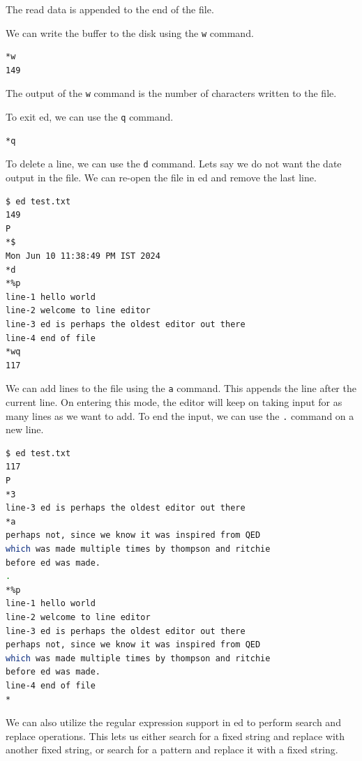 The read data is appended to the end of the file.

We can write the buffer
to the disk using the \lstinline|w| command.

\begin{lstlisting}[language=bash]
*w
149
\end{lstlisting}

The output of the \lstinline|w| command is the number of characters written to the file.

To exit ed, we can use the \lstinline|q| command.

\begin{lstlisting}[language=bash]
*q
\end{lstlisting}

To delete a line, we can use the \lstinline|d| command.
Lets say we do not want the date output in the file.
We can re-open the file in ed and remove the last line.

\begin{lstlisting}[language=bash]
$ ed test.txt
149
P
*$
Mon Jun 10 11:38:49 PM IST 2024
*d
*%p
line-1 hello world
line-2 welcome to line editor
line-3 ed is perhaps the oldest editor out there
line-4 end of file
*wq
117
\end{lstlisting}

We can add lines to the file using the \lstinline|a| command.
This appends the line after the current line.
On entering this mode, the editor will keep on taking
input for as many lines as we want to add.
To end the input, we can use the \lstinline|.| command on a new line.

\begin{lstlisting}[language=bash]
$ ed test.txt
117
P
*3
line-3 ed is perhaps the oldest editor out there
*a
perhaps not, since we know it was inspired from QED
which was made multiple times by thompson and ritchie
before ed was made.
.
*%p
line-1 hello world
line-2 welcome to line editor
line-3 ed is perhaps the oldest editor out there
perhaps not, since we know it was inspired from QED
which was made multiple times by thompson and ritchie
before ed was made.
line-4 end of file
*
\end{lstlisting}

We can also utilize the regular expression support
in ed to perform search and replace operations.
This lets us either search for a fixed string
and replace with another fixed string, or search
for a pattern and replace it with a fixed string.

